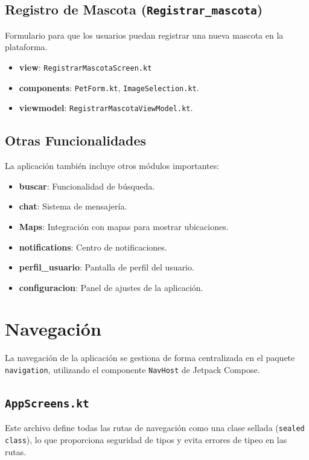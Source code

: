 \documentclass[12pt, a4paper]{article}
\begin{document}
\subsection{Registro de Mascota (\texttt{Registrar\_mascota})}
Formulario para que los usuarios puedan registrar una nueva mascota en la plataforma.
\begin{itemize}
    \item \textbf{view}: \texttt{RegistrarMascotaScreen.kt}
    \item \textbf{components}: \texttt{PetForm.kt}, \texttt{ImageSelection.kt}.
    \item \textbf{viewmodel}: \texttt{RegistrarMascotaViewModel.kt}.
\end{itemize}

\subsection{Otras Funcionalidades}
La aplicación también incluye otros módulos importantes:
\begin{itemize}
    \item \textbf{buscar}: Funcionalidad de búsqueda.
    \item \textbf{chat}: Sistema de mensajería.
    \item \textbf{Maps}: Integración con mapas para mostrar ubicaciones.
    \item \textbf{notifications}: Centro de notificaciones.
    \item \textbf{perfil\_usuario}: Pantalla de perfil del usuario.
    \item \textbf{configuracion}: Panel de ajustes de la aplicación.
\end{itemize}

\newpage

\section{Navegación}
La navegación de la aplicación se gestiona de forma centralizada en el paquete \texttt{navigation}, utilizando el componente \texttt{NavHost} de Jetpack Compose.

\subsection{\texttt{AppScreens.kt}}
Este archivo define todas las rutas de navegación como una clase sellada (\texttt{sealed class}), lo que proporciona seguridad de tipos y evita errores de tipeo en las rutas.
\end{document}
